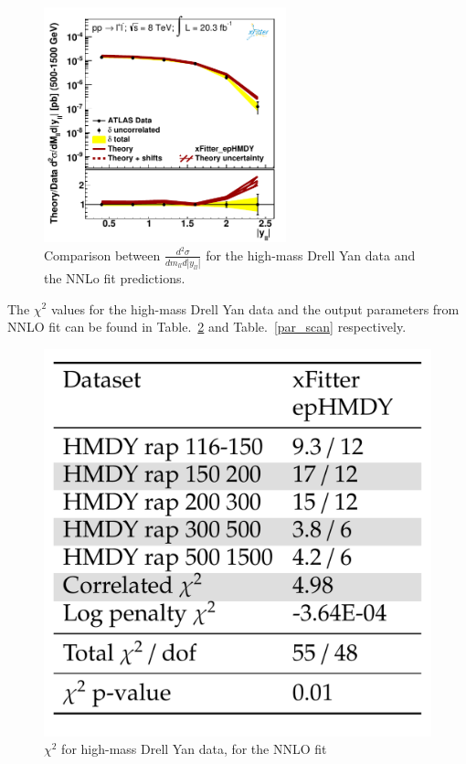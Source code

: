 \begin{figure}
\includegraphics[width=7cm]{plots/data_5.pdf} 
\caption{Comparison between $\frac{d^{2}\sigma}{dm_{ll}d|y_{ll}|}$ for the high-mass Drell Yan data and the NNLo fit predictions.}
\label{hmDY_2D}
\end{figure}
The $\chi^{2}$ values for the high-mass Drell Yan data and the output parameters from NNLO fit can be found in Table.~\ref{chi2_scan} 
and Table.~\ref{par_scan} 
respectively. 
\begin{figure}
\includegraphics[width=14cm]{plots/chi2_hmDY.pdf} 
\caption{$\chi^{2}$ for high-mass Drell Yan data, for the NNLO fit}
\label{chi2_scan}
\end{figure}
